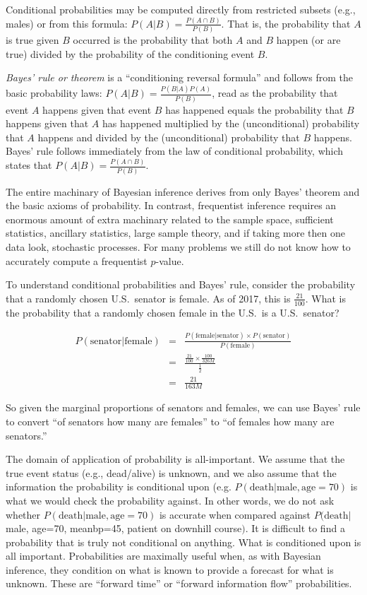 Conditional probabilities may be computed directly from restricted
subsets (e.g., males) or from this formula: $P(A|B)= \frac{P(A \cap
  B)}{P(B)}$.  That is, the probability that $A$ is true given $B$
occurred is the probability that both $A$ and $B$ happen (or are true)
divided by the probability of the conditioning event $B$.

\emph{Bayes' rule or theorem} is a ``conditioning reversal formula''
and follows from the basic probability laws:  $P(A | B) = \frac{P(B | A)
P(A)}{P(B)}$, read as the probability that event $A$ happens given
that event $B$ has happened equals the probability that $B$ happens
given that $A$ has happened multiplied by the (unconditional)
probability that $A$ happens and divided by the (unconditional)
probability that $B$ happens.  Bayes' rule follows immediately from
the law of conditional probability, which states that $P(A | B) =
\frac{P(A \cap B)}{P(B)}$.

The entire machinary of Bayesian inference derives from only Bayes'
theorem and the basic axioms of probability.  In contrast, frequentist
inference requires an enormous amount of extra machinary related to
the sample space, sufficient statistics, ancillary statistics, large
sample theory, and if taking more then one data look, stochastic
processes.  For many problems we still do not know how to 
accurately compute a frequentist $p$-value.

To understand conditional probabilities and Bayes' rule, consider the
probability that a randomly chosen U.S.\ senator is female.  As of
2017, this is $\frac{21}{100}$.  What is the probability that a
randomly chosen female in the U.S.\ is a U.S.\ senator?

\begin{eqnarray*}
P(\mathrm{senator}|\mathrm{female}) &=& \frac{P(\mathrm{female}|\mathrm{senator}) \times P(\mathrm{senator})}{P(\mathrm{female})} \\
 &=& \frac{\frac{21}{100} \times \frac{100}{326M}}{\frac{1}{2}} \\
 &=& \frac{21}{163M}
 \end{eqnarray*}

So given the marginal proportions of senators and females, we can use
Bayes' rule to convert ``of senators how many are females'' to ``of
females how many are senators.''

The domain of application of
probability is all-important.  We assume that the true event status
(e.g., dead/alive) is unknown, and we also assume that the information
the probability is conditional upon (e.g.  $P(\mathrm{death}|\mathrm{male,
age=70})$ is what we would check the probability against.  In other
words, we do not ask whether $P(\mathrm{death} | \mathrm{male,
  age=70})$ is accurate 
when compared against $P(\mathrm{death} |$ male, age=70, meanbp=45, patient
on downhill course$)$.  It is difficult to find a probability that is
truly not conditional on anything.  What is conditioned upon is all
important.  Probabilities are maximally useful when, as with Bayesian
inference, they condition on what is known to provide a forecast for
what is unknown.  These are ``forward time'' or ``forward information
flow'' probabilities.

